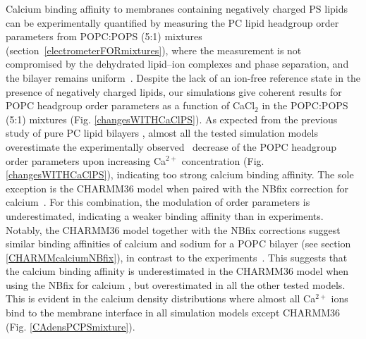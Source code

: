 \documentclass[aps,prl,superscriptaddress,twocolumn]{revtex4}
\begin{document}
Calcium binding affinity to membranes containing negatively charged PS lipids can be
experimentally quantified by measuring the PC lipid headgroup order parameters
from POPC:POPS (5:1) mixtures (section~\ref{electrometerFORmixtures}),
where the measurement is not compromised by the dehydrated lipid--ion complexes and phase separation, and the bilayer remains uniform~\cite{feigenson86,mattai89,roux90,roux91}.
Despite the lack of an ion-free reference state
in the presence of negatively charged lipids, our simulations give
coherent results for POPC headgroup order parameters as a function of
CaCl$_2$ in the POPC:POPS (5:1) mixtures (Fig. \ref{changesWITHCaClPS}).
As expected from the previous study of pure PC lipid
bilayers \cite{catte16}, almost all the tested simulation models overestimate the
experimentally observed~\cite{roux90} decrease of the POPC headgroup order parameters upon increasing Ca$^{2+}$ concentration (Fig. \ref{changesWITHCaClPS}),
indicating too strong calcium binding affinity.
The sole exception is the CHARMM36 model when paired with the NBfix
correction for calcium~\cite{kim16}. For this combination, the modulation of order parameters is underestimated, 
indicating a weaker binding affinity than in experiments.
Notably, the CHARMM36 model together with the NBfix corrections \cite{venable13,kim16} suggest similar binding affinities of
calcium and sodium for a POPC bilayer (see section \ref{CHARMMcalciumNBfix}), in contrast to the experiments~\cite{cevc90,akutsu81,altenbach84}. This suggests that the calcium binding affinity
is underestimated in the CHARMM36 model when using the NBfix for calcium \cite{kim16}, but overestimated 
in all the other tested models. This is evident in the calcium density distributions where almost all Ca$^{2+}$ ions bind to the membrane interface in all simulation models except CHARMM36 (Fig. \ref{CAdensPCPSmixture}).
\end{document}
